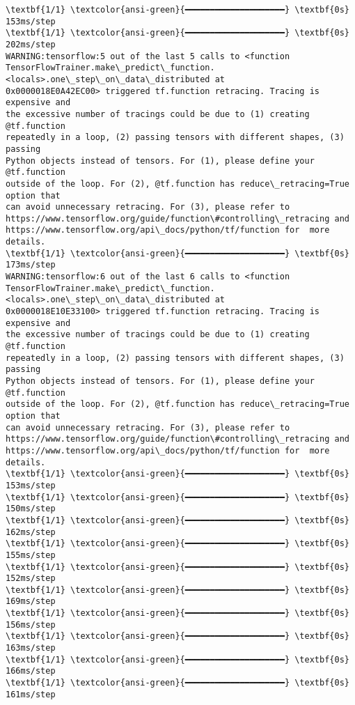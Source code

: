 \documentclass[11pt]{article}
\begin{document}
    \begin{Verbatim}[commandchars=\\\{\}]
\textbf{1/1} \textcolor{ansi-green}{━━━━━━━━━━━━━━━━━━━━} \textbf{0s} 153ms/step
\textbf{1/1} \textcolor{ansi-green}{━━━━━━━━━━━━━━━━━━━━} \textbf{0s} 202ms/step
WARNING:tensorflow:5 out of the last 5 calls to <function
TensorFlowTrainer.make\_predict\_function.<locals>.one\_step\_on\_data\_distributed at
0x0000018E0A42EC00> triggered tf.function retracing. Tracing is expensive and
the excessive number of tracings could be due to (1) creating @tf.function
repeatedly in a loop, (2) passing tensors with different shapes, (3) passing
Python objects instead of tensors. For (1), please define your @tf.function
outside of the loop. For (2), @tf.function has reduce\_retracing=True option that
can avoid unnecessary retracing. For (3), please refer to
https://www.tensorflow.org/guide/function\#controlling\_retracing and
https://www.tensorflow.org/api\_docs/python/tf/function for  more details.
\textbf{1/1} \textcolor{ansi-green}{━━━━━━━━━━━━━━━━━━━━} \textbf{0s} 173ms/step
WARNING:tensorflow:6 out of the last 6 calls to <function
TensorFlowTrainer.make\_predict\_function.<locals>.one\_step\_on\_data\_distributed at
0x0000018E10E33100> triggered tf.function retracing. Tracing is expensive and
the excessive number of tracings could be due to (1) creating @tf.function
repeatedly in a loop, (2) passing tensors with different shapes, (3) passing
Python objects instead of tensors. For (1), please define your @tf.function
outside of the loop. For (2), @tf.function has reduce\_retracing=True option that
can avoid unnecessary retracing. For (3), please refer to
https://www.tensorflow.org/guide/function\#controlling\_retracing and
https://www.tensorflow.org/api\_docs/python/tf/function for  more details.
\textbf{1/1} \textcolor{ansi-green}{━━━━━━━━━━━━━━━━━━━━} \textbf{0s} 153ms/step
\textbf{1/1} \textcolor{ansi-green}{━━━━━━━━━━━━━━━━━━━━} \textbf{0s} 150ms/step
\textbf{1/1} \textcolor{ansi-green}{━━━━━━━━━━━━━━━━━━━━} \textbf{0s} 162ms/step
\textbf{1/1} \textcolor{ansi-green}{━━━━━━━━━━━━━━━━━━━━} \textbf{0s} 155ms/step
\textbf{1/1} \textcolor{ansi-green}{━━━━━━━━━━━━━━━━━━━━} \textbf{0s} 152ms/step
\textbf{1/1} \textcolor{ansi-green}{━━━━━━━━━━━━━━━━━━━━} \textbf{0s} 169ms/step
\textbf{1/1} \textcolor{ansi-green}{━━━━━━━━━━━━━━━━━━━━} \textbf{0s} 156ms/step
\textbf{1/1} \textcolor{ansi-green}{━━━━━━━━━━━━━━━━━━━━} \textbf{0s} 163ms/step
\textbf{1/1} \textcolor{ansi-green}{━━━━━━━━━━━━━━━━━━━━} \textbf{0s} 166ms/step
\textbf{1/1} \textcolor{ansi-green}{━━━━━━━━━━━━━━━━━━━━} \textbf{0s} 161ms/step

\end{Verbatim}
\end{document}
